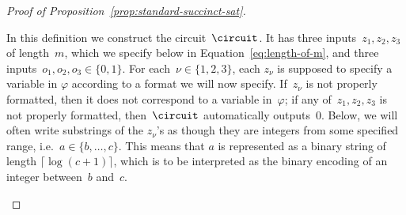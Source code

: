 \begin{proof}[Proof of Proposition~\ref{prop:standard-succinct-sat}]
\begin{definition}
  In this definition we construct the circuit~$\circuit$.
  It has three inputs~$z_1, z_2, z_3$ of length~$m$, which we specify below in
  Equation~\eqref{eq:length-of-m}, and three inputs~$o_1, o_2, o_3 \in \{0,
  1\}$.
	For each~$\nu \in \{1, 2, 3\}$, each $z_\nu$ is supposed to specify a variable
  in $\varphi$ according to a format we will now specify.
	If~$z_\nu$ is not properly formatted, then it does not correspond to a
  variable in~$\varphi$; if any of~$z_1, z_2, z_3$ is not properly formatted,
  then~$\circuit$ automatically outputs~$0$.
	Below, we will often write substrings of the $z_\nu$'s as though they are
  integers from some specified range, i.e.\ $a \in \{b, \ldots, c\}$.
	This means that $a$ is represented as a binary string of length $\lceil
  \log(c+1) \rceil$, which is to be interpreted as the binary encoding of an
  integer between~$b$ and~$c$.
	

\end{definition}
\end{proof}
